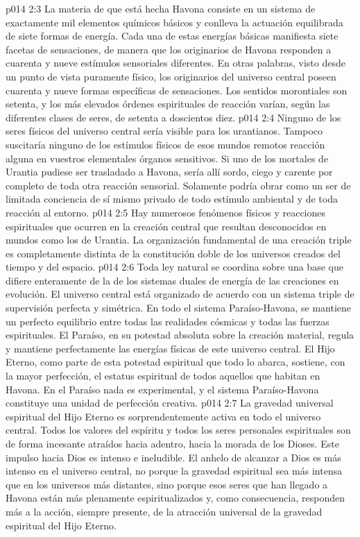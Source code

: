 \vs p014 2:3 La materia de que está hecha Havona consiste en un sistema de exactamente mil elementos químicos básicos y conlleva la actuación equilibrada de siete formas de energía. Cada una de estas energías básicas manifiesta siete facetas de sensaciones, de manera que los originarios de Havona responden a cuarenta y nueve estímulos sensoriales diferentes. En otras palabras, visto desde un punto de vista puramente físico, los originarios del universo central poseen cuarenta y nueve formas específicas de sensaciones. Los sentidos morontiales son setenta, y los más elevados órdenes espirituales de reacción varían, según las diferentes clases de seres, de setenta a doscientos diez.
\vs p014 2:4 Ninguno de los seres físicos del universo central sería visible para los urantianos. Tampoco suscitaría ninguno de los estímulos físicos de esos mundos remotos reacción alguna en vuestros elementales órganos sensitivos. Si uno de los mortales de Urantia pudiese ser trasladado a Havona, sería allí sordo, ciego y carente por completo de toda otra reacción sensorial. Solamente podría obrar como un ser de limitada conciencia de sí mismo privado de todo estímulo ambiental y de toda reacción al entorno.
\vs p014 2:5 \pc Hay numerosos fenómenos físicos y reacciones espirituales que ocurren en la creación central que resultan desconocidos en mundos como los de Urantia. La organización fundamental de una creación triple es completamente distinta de la constitución doble de los universos creados del tiempo y del espacio.
\vs p014 2:6 Toda ley natural se coordina sobre una base que difiere enteramente de la de los sistemas duales de energía de las creaciones en evolución. El universo central está organizado de acuerdo con un sistema triple de supervisión perfecta y simétrica. En todo el sistema Paraíso\hyp{}Havona, se mantiene un perfecto equilibrio entre todas las realidades cósmicas y todas las fuerzas espirituales. El Paraíso, en su potestad absoluta sobre la creación material, regula y mantiene perfectamente las energías físicas de este universo central. El Hijo Eterno, como parte de esta potestad espiritual que todo lo abarca, sostiene, con la mayor perfección, el estatus espiritual de todos aquellos que habitan en Havona. En el Paraíso nada es experimental, y el sistema Paraíso\hyp{}Havona constituye una unidad de perfección creativa.
\vs p014 2:7 La gravedad universal espiritual del Hijo Eterno es sorprendentemente activa en todo el universo central. Todos los valores del espíritu y todos los seres personales espirituales son de forma incesante atraídos hacia adentro, hacia la morada de los Dioses. Este impulso hacia Dios es intenso e ineludible. El anhelo de alcanzar a Dios es más intenso en el universo central, no porque la gravedad espiritual sea más intensa que en los universos más distantes, sino porque esos seres que han llegado a Havona están más plenamente espiritualizados y, como consecuencia, responden más a la acción, siempre presente, de la atracción universal de la gravedad espiritual del Hijo Eterno.
